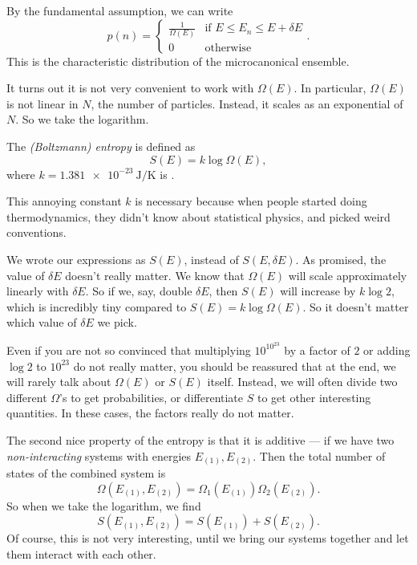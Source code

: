 \documentclass[a4paper]{article}
\begin{document}
By the fundamental assumption, we can write
\[
  p(n) =
  \begin{cases}
    \frac{1}{\Omega(E)} & \text{if } E \leq E_n \leq E + \delta E\\
    0 & \text{otherwise}
  \end{cases}.
\]
This is the characteristic distribution of the microcanonical ensemble.

It turns out it is not very convenient to work with $\Omega(E)$. In particular, $\Omega(E)$ is not linear in $N$, the number of particles. Instead, it scales as an exponential of $N$. So we take the logarithm.

\begin{defi}
  The \emph{(Boltzmann) entropy} is defined as
  \[
    S(E) = k \log \Omega(E),
  \]
  where $k = \SI{1.381e-23}{\joule\per\kelvin}$ is .
\end{defi}
This annoying constant $k$ is necessary because when people started doing thermodynamics, they didn't know about statistical physics, and picked weird conventions.

We wrote our expressions as $S(E)$, instead of $S(E, \delta E)$. As promised, the value of $\delta E$ doesn't really matter. We know that $\Omega(E)$ will scale approximately linearly with $\delta E$. So if we, say, double $\delta E$, then $S(E)$ will increase by $k \log 2$, which is incredibly tiny compared to $S(E) = k \log \Omega(E)$. So it doesn't matter which value of $\delta E$ we pick.

Even if you are not so convinced that multiplying $10^{10^{23}}$ by a factor of $2$ or adding $\log 2$ to $10^{23}$ do not really matter, you should be reassured that at the end, we will rarely talk about $\Omega(E)$ or $S(E)$ itself. Instead, we will often divide two different $\Omega$'s to get probabilities, or differentiate $S$ to get other interesting quantities. In these cases, the factors really do not matter.


The second nice property of the entropy is that it is additive --- if we have two \emph{non-interacting} systems with energies $E_{(1)}, E_{(2)}$. Then the total number of states of the combined system is
\[
  \Omega(E_{(1)}, E_{(2)}) = \Omega_{1}(E_{(1)})\Omega_{2} (E_{(2)}).
\]
So when we take the logarithm, we find
\[
  S(E_{(1)}, E_{(2)}) = S(E_{(1)}) + S(E_{(2)}).
\]
Of course, this is not very interesting, until we bring our systems together and let them interact with each other.
\end{document}
